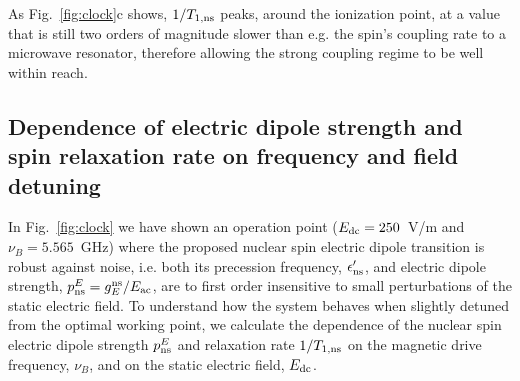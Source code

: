 As Fig.~\ref{fig:clock}c shows, ${1}/{T_{1,\rm ns}}$ peaks, around the ionization point, at a value that is still two orders of magnitude slower than e.g. the spin's coupling rate to a microwave resonator, therefore allowing the strong coupling regime to be well within reach.


\subsection{Dependence of electric dipole strength and spin relaxation rate on frequency and field detuning} \label{supp:detdep}

In Fig.~\ref{fig:clock} we have shown an operation point ($E_{\rm dc}=250$~V/m and $\nu_B=5.565$~GHz) where the proposed nuclear spin electric dipole transition is robust against noise, i.e. both its precession frequency, $\epsilon_{\rm ns}'$, and electric dipole strength, $p^E_{\rm ns}=g_E^{\rm ns}/E_{\rm ac}$, are to first order insensitive to small perturbations of the static electric field. To understand how the system behaves when slightly detuned from the optimal working point, we calculate the dependence of the nuclear spin electric dipole strength $p^E_{\rm ns}$ and relaxation rate $1/T_{1, \rm ns}$ on the magnetic drive frequency, $\nu_B$, and on the static electric field, $E_{\rm dc}$. 

